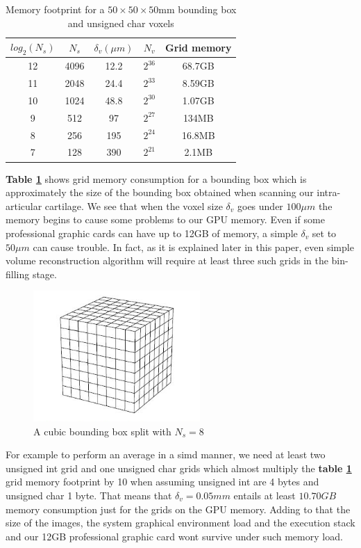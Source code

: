 \documentclass[12pt,journal,compsoc]{IEEEtran}
\begin{document}
\begin{table}[!hb]
\renewcommand{\arraystretch}{1.3}
\caption{Memory footprint for a $50\times 50\times 50$mm bounding box and unsigned char voxels}
\centering
\begin{tabular}{|c|c||c|c||c|}
\hline
$log_2(N_s)$ & $N_s$ & $\delta_v (\mu m)$ & $N_v$ & Grid memory \\
\hline
12 & 4096 & 12.2 & $2^{36}$ & 68.7GB\\\hline
11 & 2048 & 24.4 & $2^{33}$ & 8.59GB\\\hline
10 & 1024 & 48.8 & $2^{30}$ & 1.07GB\\\hline
9 & 512 & 97 & $2^{27}$ & 134MB\\\hline
8 & 256 & 195 & $2^{24}$ & 16.8MB\\\hline
7 & 128 & 390 & $2^{21}$ & 2.1MB\\\hline
\end{tabular}
\label{memory_table}
\end{table}
\textbf{Table \ref{memory_table}} shows grid memory consumption for a bounding box which is approximately the size of the bounding box obtained when scanning our intra-articular cartilage.
We see that when the voxel size $\delta_v$ goes under $100\mu m$ the memory begins to cause some problems to our GPU memory.
Even if some professional graphic cards can have up to 12GB of memory, a simple $\delta_v$ set to $50\mu m$ can cause trouble.
In fact, as it is explained later in this paper, even simple volume reconstruction algorithm will require at least three such grids in the bin-filling stage.

\begin{figure}[!ht]
\centering
\includegraphics[width=2.5in]{grid}
\caption{A cubic bounding box split with $N_s=8$}
\label{grid}
\end{figure}

For example to perform an average in a \acl{simd} manner, we need at least two unsigned int grid and one unsigned char grids which almost multiply the \textbf{table \ref{memory_table}} grid memory footprint by 10 when assuming unsigned int are 4 bytes and unsigned char 1 byte.
That means that $\delta_v=0.05mm$ entails at least $10.70GB$ memory consumption just for the grids on the GPU memory.
Adding to that the size of the images, the system graphical environment load and the execution stack and our 12GB professional graphic card wont survive under such memory load.
\end{document}
